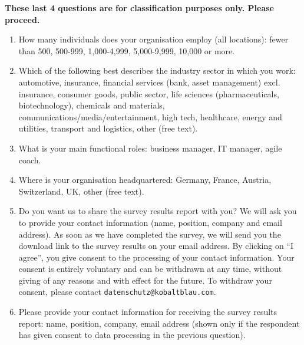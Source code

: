 \documentclass{article}
\begin{document}
    \textbf{These last 4 questions are for classification purposes only. Please proceed.}

\begin{enumerate}
    \item How many individuals does your organisation employ (all locations): fewer than 500, 500-999, 1,000-4,999, 5,000-9,999, 10,000 or more.
    \item Which of the following best describes the industry sector in which you work: automotive, insurance, financial services (bank, asset management) excl. insurance, consumer goods, public sector, life sciences (pharmaceuticals, biotechnology), chemicals and materials, communications/media/entertainment, high tech, healthcare, energy and utilities, transport and logistics, other (free text).
    \item What is your main functional roles: business manager, IT manager, agile coach.
    \item Where is your organisation headquartered: Germany, France, Austria, Switzerland, UK, other (free text).
    \item Do you want us to share the survey results report with you? We will ask you to provide your contact information (name, position, company and email address). As soon as we have completed the survey, we will send you the download link to the survey results on your email address. By clicking on “I agree”, you give consent to the processing of your contact information. Your consent is entirely voluntary and can be withdrawn at any time, without giving of any reasons and with effect for the future. To withdraw your consent, please contact \texttt{datenschutz@kobaltblau.com}.
    \item Please provide your contact information for receiving the survey results report: name, position, company, email address (shown only if the respondent has given consent to data processing in the previous question).

\end{enumerate}

\printbibliography

%
%
\end{document}
